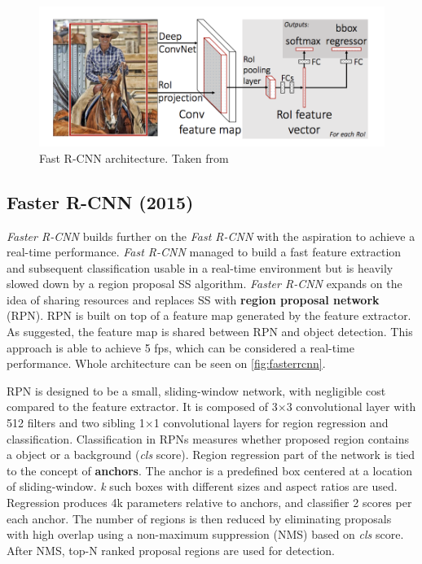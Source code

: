 \begin{figure}
    \centering
    \includegraphics[width=\textwidth]{img/fastrcnn}
    \caption{Fast R-CNN architecture. Taken from \cite[fig. 1]{bib:fastrcnn}}
    \label{fig:fastrcnn}
\end{figure}

\subsection{Faster R-CNN (2015)}
 
 \textit{Faster R-CNN} \cite{bib:fasterrcnn} builds further on the \textit{Fast R-CNN} with the aspiration to achieve a real-time performance. \textit{Fast R-CNN} managed to build a fast feature extraction and subsequent classification usable in a real-time environment but is heavily slowed down by a region proposal SS algorithm. \textit{Faster R-CNN} expands on the idea of sharing resources and replaces SS with \textbf{region proposal network} (RPN). RPN is built on top of a feature map generated by the feature extractor. As suggested, the feature map is shared between RPN and object detection. This approach is able to achieve 5 fps, which can be considered a real-time performance. Whole architecture can be seen on \cref{fig:fasterrcnn}. 
 
 RPN is designed to be a small, sliding-window network, with negligible cost compared to the feature extractor. It is composed of 3$\times$3 convolutional layer with 512 filters and two sibling 1$\times$1 convolutional layers for region regression and classification. Classification in RPNs measures whether proposed region contains a object or a background (\textit{cls} score). Region regression part of the network is tied to the concept of \textbf{anchors}. The anchor is a predefined box centered at a location of sliding-window. \textit{k} such boxes with different sizes and aspect ratios are used. Regression produces 4k parameters relative to anchors, and classifier 2 scores per each anchor. The number of regions is then reduced by eliminating proposals with high overlap using a non-maximum suppression (NMS) based on \textit{cls} score. After NMS, top-N ranked proposal regions are used for detection.
 
